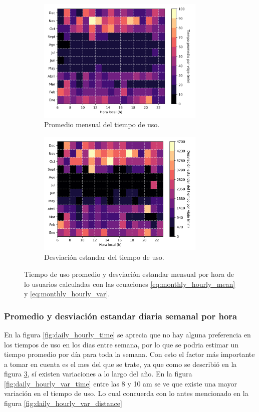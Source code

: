 \begin{figure}[H]
    \centering
    \begin{subfigure}[b]{8cm}
        \includegraphics[width=8cm]{Graphics/monthly_hourly_mean_time_travel.png}
        \caption{Promedio mensual del tiempo de uso.}
        \label{fig:monthly_hourly_mean_time}
    \end{subfigure}
    \begin{subfigure}[b]{8cm}
        \includegraphics[width=8cm]{Graphics/monthly_hourly_var_time_travel.png}
        \caption{Desviación estandar del tiempo de uso.}
        \label{fig:monthly_hourly_var_time}
    \end{subfigure}
    \caption{Tiempo de uso promedio y desviación estandar mensual por hora de lo usuarios calculadas con las ecuaciones \ref{eq:monthly_hourly_mean} y \ref{eq:monthly_hourly_var}.}
    \label{fig:monthly_hourly_time}
\end{figure}

\subsubsection{Promedio y desviación estandar diaria semanal por hora}

En la figura \ref{fig:daily_hourly_time} se aprecia que no hay alguna preferencia en los tiempos de uso en los dias entre semana, por lo que se podria estimar un tiempo promedio por día para toda la semana. Con esto el factor más importante a tomar en cuenta es el mes del que se trate, ya que como se describió en la figura \ref{fig:monthly_hourly_time}, sí existen variaciones a lo largo del año. En la figura \ref{fig:daily_hourly_var_time} entre las 8 y 10 am se ve que existe una mayor variación en el tiempo de uso. Lo cual concuerda con lo antes mencionado en la figura \ref{fig:daily_hourly_var_distance}


